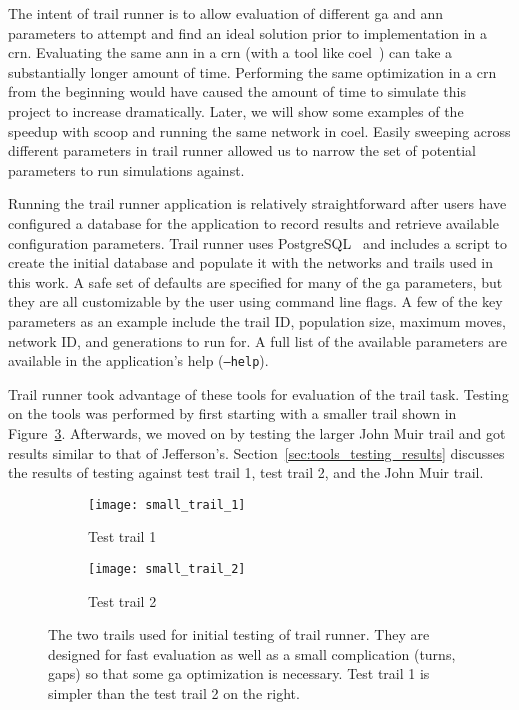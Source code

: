 The intent of trail runner is to allow evaluation of different \gls{ga} and \gls{ann} parameters to attempt and find an ideal solution prior to implementation in a \gls{crn}. Evaluating the same \gls{ann} in a \gls{crn} (with a tool like \gls{coel}~\cite{Banda2014-qw}) can take a substantially longer amount of time. Performing the same optimization in a \gls{crn} from the beginning would have caused the amount of time to simulate this project to increase dramatically. Later, we will show some examples of the speedup with \gls{scoop} and running the same network in \gls{coel}. Easily sweeping across different parameters in trail runner allowed us to narrow the set of potential parameters to run simulations against.

Running the trail runner application is relatively straightforward after users have configured a database for the application to record results and retrieve available configuration parameters. Trail runner uses PostgreSQL~\cite{The_PostgreSQL_Global_Development_Group1996-qt} and includes a script to create the initial database and populate it with the networks and trails used in this work. A safe set of defaults are specified for many of the \gls{ga} parameters, but they are all customizable by the user using command line flags. A few of the key parameters as an example include the trail ID, population size, maximum moves, network ID, and generations to run for. A full list of the available parameters are available in the application's help (\texttt{--help}).

Trail runner took advantage of these tools for evaluation of the trail task. Testing on the tools was performed by first starting with a smaller trail shown in Figure~\ref{fig:test_trails}. Afterwards, we moved on by testing the larger John Muir trail and got results similar to that of Jefferson's. Section~\ref{sec:tools_testing_results} discusses the results of testing against test trail 1, test trail 2, and the John Muir trail.

\begin{figure}
\centering
\begin{subfigure}[b]{.5\textwidth}
    \centering
    \texttt{[image: small\_trail\_1]}
    \caption{Test trail 1}
    \label{fig:test_trail_1}
\end{subfigure}%
\begin{subfigure}[b]{.5\textwidth}
    \centering
    \texttt{[image: small\_trail\_2]}
    \caption{Test trail 2}
    \label{fig:test_trail_2}
\end{subfigure}
\caption[Two Test Trails]{The two trails used for initial testing of trail runner. They are designed for fast evaluation as well as a small complication (turns, gaps) so that some \gls{ga} optimization is necessary. Test trail 1 is simpler than the test trail 2 on the right.}
\label{fig:test_trails}
\end{figure}

